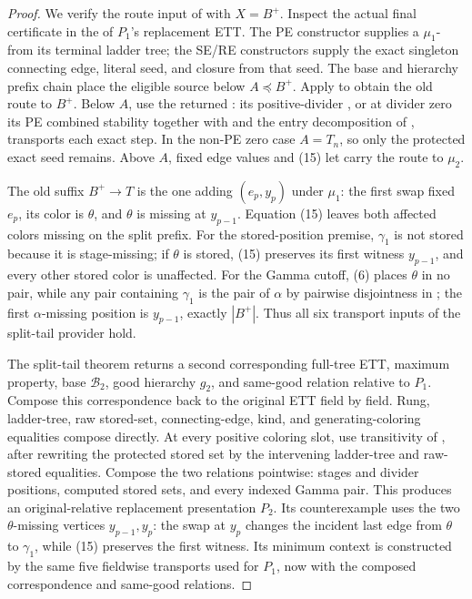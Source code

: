 \begin{proof}
We verify the route input of
 with \(X=B^+\).  Inspect the
actual final certificate in the  of \(P_1\)'s
replacement ETT.  The PE constructor supplies a
\(\mu_1\)- from its terminal ladder tree; the
SE/RE constructors supply the exact singleton connecting edge, literal
 seed, and closure from that seed.
The base and hierarchy prefix chain place the eligible source below
\(A\preccurlyeq B^+\).  Apply
 to obtain the old route to
\(B^+\).  Below \(A\), use the returned
: its positive-divider
, or at divider zero its PE combined
stability together with  and the
entry decomposition of , transports each exact
step.  In the non-PE zero case \(A=T_n\), so only the protected exact seed
remains.  Above \(A\), fixed edge values and (15) let
 carry the route
to \(\mu_2\).

The old suffix \(B^+\to T\) is the one
 adding \((e_p,y_p)\) under \(\mu_1\):
the first swap fixed \(e_p\), its color is \(\theta\), and \(\theta\)
is missing at \(y_{p-1}\).  Equation (15) leaves both affected colors
missing on the split prefix.  For the stored-position premise,
\(\gamma_1\) is not stored because it is stage-missing; if \(\theta\)
is stored, (15) preserves its first witness \(y_{p-1}\), and every other
stored color is unaffected.  For the Gamma cutoff, (6) places \(\theta\)
in no pair, while any pair containing \(\gamma_1\) is the pair of
\(\alpha\) by pairwise disjointness in ; the first
\(\alpha\)-missing position is \(y_{p-1}\), exactly \(|B^+|\).  Thus all
six transport inputs of the split-tail provider hold.

The split-tail theorem returns a second corresponding full-tree ETT,
maximum property, base \(\mathcal B_2\), good hierarchy \(g_2\), and
same-good relation relative to \(P_1\).  Compose this correspondence back
to the original ETT field by field.  Rung, ladder-tree, raw stored-set,
connecting-edge, kind, and generating-coloring equalities compose
directly.  At every positive coloring slot, use transitivity
 of , after rewriting the protected
stored set by the intervening ladder-tree and raw-stored equalities.
Compose the two  relations pointwise: stages
and divider positions, computed stored sets, and every indexed Gamma pair.
This produces an original-relative replacement presentation \(P_2\).
Its counterexample uses the two \(\theta\)-missing vertices
\(y_{p-1},y_p\): the swap at \(y_p\) changes the incident last edge from
\(\theta\) to \(\gamma_1\), while (15) preserves the first witness.
Its minimum context is constructed by the same five fieldwise transports
used for \(P_1\), now with the composed correspondence and same-good
relations.


\end{proof}
